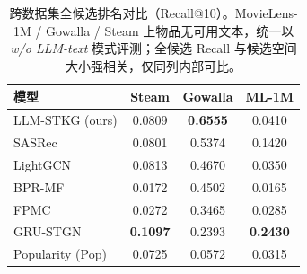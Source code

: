 \begin{table}[t]
\centering
\caption{跨数据集全候选排名对比（Recall@10）。MovieLens-1M / Gowalla / Steam 上物品无可用文本，统一以 \emph{w/o LLM-text} 模式评测；全候选 Recall 与候选空间大小强相关，仅同列内部可比。}
\label{tab:cross-dataset}
\begin{tabular}{lccc}
\toprule
模型 & Steam & Gowalla & ML-1M \\
\midrule
LLM-STKG (ours) & 0.0809 & \textbf{0.6555} & 0.0410 \\
SASRec & 0.0801 & 0.5374 & 0.1420 \\
LightGCN & 0.0813 & 0.4670 & 0.0350 \\
BPR-MF & 0.0172 & 0.4502 & 0.0165 \\
FPMC & 0.0272 & 0.3465 & 0.0285 \\
GRU-STGN & \textbf{0.1097} & 0.2393 & \textbf{0.2430} \\
Popularity (Pop) & 0.0725 & 0.0572 & 0.0315 \\
\bottomrule
\end{tabular}
\end{table}